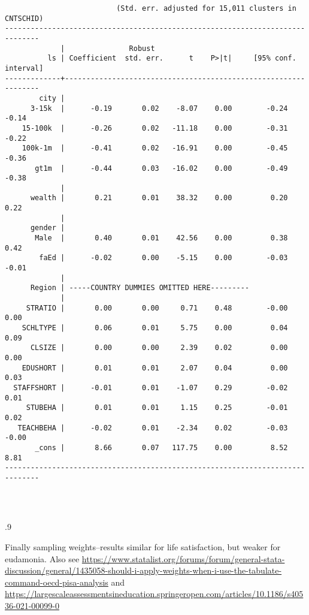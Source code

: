 \documentclass[10pt, letterpaper]{article}
\begin{document}
\begin{spacing}{1.4}
\begin{spacing}{.5}
\begin{scriptsize}
\begin{verbatim}
                          (Std. err. adjusted for 15,011 clusters in CNTSCHID)
------------------------------------------------------------------------------
             |               Robust
          ls | Coefficient  std. err.      t    P>|t|     [95% conf. interval]
-------------+----------------------------------------------------------------
        city |
      3-15k  |      -0.19       0.02    -8.07    0.00        -0.24       -0.14
    15-100k  |      -0.26       0.02   -11.18    0.00        -0.31       -0.22
    100k-1m  |      -0.41       0.02   -16.91    0.00        -0.45       -0.36
       gt1m  |      -0.44       0.03   -16.02    0.00        -0.49       -0.38
             |
      wealth |       0.21       0.01    38.32    0.00         0.20        0.22
             |
      gender |
       Male  |       0.40       0.01    42.56    0.00         0.38        0.42
        faEd |      -0.02       0.00    -5.15    0.00        -0.03       -0.01
             |
      Region | -----COUNTRY DUMMIES OMITTED HERE---------
             |
     STRATIO |       0.00       0.00     0.71    0.48        -0.00        0.00
    SCHLTYPE |       0.06       0.01     5.75    0.00         0.04        0.09
      CLSIZE |       0.00       0.00     2.39    0.02         0.00        0.00
    EDUSHORT |       0.01       0.01     2.07    0.04         0.00        0.03
  STAFFSHORT |      -0.01       0.01    -1.07    0.29        -0.02        0.01
     STUBEHA |       0.01       0.01     1.15    0.25        -0.01        0.02
   TEACHBEHA |      -0.02       0.01    -2.34    0.02        -0.03       -0.00
       _cons |       8.66       0.07   117.75    0.00         8.52        8.81
------------------------------------------------------------------------------




\end{verbatim}
\end{scriptsize}
\end{spacing}{.9}

Finally sampling weights--results similar for life satisfaction, but weaker for
eudamonia. Also see
\url{https://www.statalist.org/forums/forum/general-stata-discussion/general/1435058-should-i-apply-weights-when-i-use-the-tabulate-command-oecd-pisa-analysis}
and \url{https://largescaleassessmentsineducation.springeropen.com/articles/10.1186/s40536-021-00099-0}

\begin{spacing}{.5}
\begin{scriptsize}
\begin{verbatim}


\end{verbatim}
\end{scriptsize}
\end{spacing}
\end{spacing}
\end{document}

